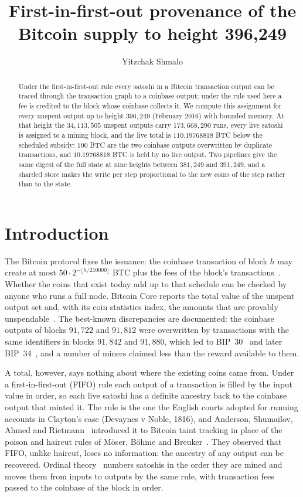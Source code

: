 \documentclass[11pt]{amsart}
\title{First-in-first-out provenance of the Bitcoin supply to height 396{,}249}
\author{Yitzchak Shmalo}
\date{}
\begin{document}
\begin{abstract}
Under the first-in-first-out rule every satoshi in a Bitcoin transaction output can be traced through the transaction graph to a coinbase output; under the rule used here a fee is credited to the block whose coinbase collects it. We compute this assignment for every unspent output up to height $396{,}249$ (February 2016) with bounded memory. At that height the $34{,}113{,}505$ unspent outputs carry $173{,}668{,}290$ runs, every live satoshi is assigned to a mining block, and the live total is $110.19768818$ BTC below the scheduled subsidy: $100$ BTC are the two coinbase outputs overwritten by duplicate transactions, and $10.19768818$ BTC is held by no live output. Two pipelines give the same digest of the full state at nine heights between $381{,}249$ and $391{,}249$, and a sharded store makes the write per step proportional to the new coins of the step rather than to the state.
\end{abstract}
\maketitle

\section{Introduction}

The Bitcoin protocol fixes the issuance: the coinbase transaction of block $h$ may create at most $50 \cdot 2^{-\lfloor h/210000\rfloor}$ BTC plus the fees of the block's transactions~\cite{Nak08}. Whether the coins that exist today add up to that schedule can be checked by anyone who runs a full node. Bitcoin Core reports the total value of the unspent output set and, with its coin statistics index, the amounts that are provably unspendable~\cite{CoreStats}. The best-known discrepancies are documented: the coinbase outputs of blocks $91{,}722$ and $91{,}812$ were overwritten by transactions with the same identifiers in blocks $91{,}842$ and $91{,}880$, which led to BIP~30~\cite{BIP30} and later BIP~34~\cite{BIP34}, and a number of miners claimed less than the reward available to them.

A total, however, says nothing about where the existing coins came from. Under a first-in-first-out (FIFO) rule each output of a transaction is filled by the input value in order, so each live satoshi has a definite ancestry back to the coinbase output that minted it. The rule is the one the English courts adopted for running accounts in Clayton's case (Devaynes v Noble, 1816), and Anderson, Shumailov, Ahmed and Rietmann~\cite{ASAR18} introduced it to Bitcoin taint tracking in place of the poison and haircut rules of M\"oser, B\"ohme and Breuker~\cite{MBB14}. They observed that FIFO, unlike haircut, loses no information: the ancestry of any output can be recovered. Ordinal theory~\cite{Ord} numbers satoshis in the order they are mined and moves them from inputs to outputs by the same rule, with transaction fees passed to the coinbase of the block in order.
\end{document}
